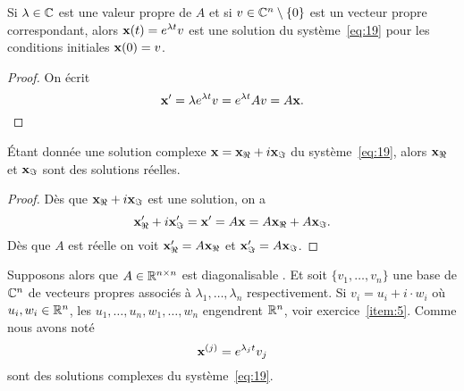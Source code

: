\begin{lemma}
  \label{lem:15}
  Si $\lambda \in \mathbb{C}$ est une valeur propre de $A$ et si $v \in \mathbb{C}^n \setminus \{0\}$ est un vecteur propre correspondant, alors $\mathbf{x}(t) = e^{\lambda t} v$ est  une solution du système~\eqref{eq:19} pour les conditions initiales $\mathbf{x}(0) = v$. 
\end{lemma}
\begin{proof}
  On écrit 
  \begin{displaymath}
    \mathbf{x}' = \lambda e^{\lambda t} v = e^{\lambda t} Av = A\mathbf{x}.
  \end{displaymath}
\end{proof}


\begin{lemma}
  \label{lem:14}
  Étant donnée une solution complexe $\mathbf{x} = \mathbf{x}_\Re + i \mathbf{x}_\Im$ du système~\eqref{eq:19}, alors $\mathbf{x}_\Re$ et $\mathbf{x}_\Im$ sont des solutions réelles.  
\end{lemma}
\begin{proof}
  Dès que $\mathbf{x}_\Re + i \mathbf{x}_\Im $ est une solution, on a 
  \begin{displaymath}
   \mathbf{x}'_\Re+ i \mathbf{x}'_\Im = \mathbf{x}' = A \mathbf{x} = A\mathbf{x}_\Re + A\mathbf{x}_\Im. 
  \end{displaymath}
Dès que $A $ est réelle on voit $\mathbf{x}_\Re' = A\mathbf{x}_\Re$ et $\mathbf{x}'_\Im = A \mathbf{x}_\Im$. 
\end{proof}


Supposons alors que $A \in \mathbb{R}^{n \times n}$ est diagonalisable . Et soit $\{v_1,\dots,v_n\}$ une base de $\mathbb{C}^n$ de vecteurs propres associés à 
$\lambda_1,\dots,\lambda_n$ respectivement. Si $v_i = u_i + i \cdot w_i$  où $u_i,w_i \in \mathbb{R}^n$, les $u_1,\dots,u_n,w_1,\dots,w_n$ engendrent $\mathbb{R}^n$, voir exercice~\ref{item:5}. Comme nous avons noté 
\begin{displaymath}
  \mathbf{x}^{(j)} = e^{\lambda_j t} v_j
\end{displaymath}
sont des solutions complexes du système~\eqref{eq:19}.   

